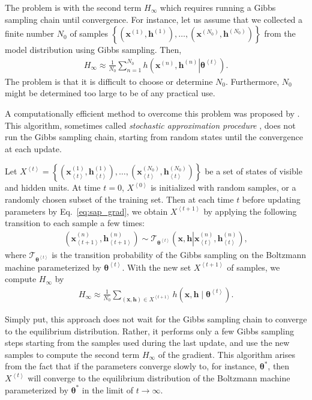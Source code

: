 \documentclass{now}
\newcommand{\qt}[1]{\left<#1\right>}
\newcommand{\vect}[1]{\mathbf{#1}}
\newcommand{\vects}[1]{\boldsymbol{#1}}
\newcommand{\vh}[0]{\vect{h}}
\newcommand{\vx}[0]{\vect{x}}
\newcommand{\TT}[0]{{\vects{\theta}}}
\newcommand{\T}[0]{\mathcal{T}}
\begin{document}
The problem is with the second term $H_\infty$ which requires
running a Gibbs sampling chain until convergence. For instance,
let us assume that we collected a finite number $N_0$ of
samples $\left\{ (\vx^{(1)}, \vh^{(1)}), \dots,
(\vx^{(N_0)}, \vh^{(N_0)}) \right\}$ from the model
distribution using Gibbs sampling. Then, 
\begin{align*}
    H_\infty \approx \frac{1}{N_0} \sum_{n=1}^{N_0}
    h\left(\left.\vx^{(n)}, \vh^{(n)} \right| \TT^{\qt{t}}\right).
\end{align*}
The 
problem is that it is difficult to choose or determine $N_0$.
Furthermore, $N_0$ might be determined too large to be of any
practical use.

A computationally efficient method to overcome this problem
was proposed by \citet{Younes1988}. This algorithm, sometimes
called \textit{stochastic approximation procedure}
\citep{Salakhutdinov2009}, does not run the Gibbs
sampling chain, starting from random states until the
convergence at each update.

Let $X^{\qt{t}} = \left\{ \left(\vx_{\qt{t}}^{(1)},
\vh_{\qt{t}}^{(1)}\right),
\dots, \left(\vx_{\qt{t}}^{(N_0)}, \vh_{\qt{t}}^{(N_0)}\right)\right\}$ be
a set of states of visible and hidden units. At time $t=0$,
$X^{\qt{0}}$ is initialized with random samples, or a randomly
chosen subset of the training set. Then at each time $t$ 
before updating parameters by
Eq.~\eqref{eq:sap_grad}, we obtain
$X^{\qt{t+1}}$ by applying the following transition to each
sample a few times:
\begin{align*}
    \left( \vx_{\qt{t+1}}^{(n)}, \vh_{\qt{t+1}}^{(n)}\right) \sim
    \T_{\TT^{\qt{t}}} \left(\vx, \vh \left| \vx_{\qt{t}}^{(n)},
    \vh_{\qt{t}}^{(n)}\right.\right),
\end{align*}
where $\T_{\TT^{\qt{t}}}$ is the transition probability of the
Gibbs sampling on the Boltzmann machine parameterized by
$\TT^{\qt{t}}$. With the new set $X^{\qt{t+1}}$ of samples, we compute
$H_\infty$ by
\begin{align*}
    H_\infty \approx \frac{1}{N_0} \sum_{(\vx, \vh) \in
    X^{\qt{t+1}}}
    h\left(\vx, \vh \mid \TT^{\qt{t}}\right).
\end{align*}

Simply put, this approach does not wait for the Gibbs
sampling chain to converge to the equilibrium distribution.
Rather, it performs only a few Gibbs sampling steps starting
from the samples used during the last update, and use the
new samples to compute the second term $H_\infty$ of the
gradient. This algorithm arises from the fact that if the
parameters converge slowly to, for instance, $\TT^*$, then
$X^{\qt{t}}$ will converge to the equilibrium distribution of the
Boltzmann machine parameterized by $\TT^*$ in the limit of
$t \to \infty$.
\end{document}
